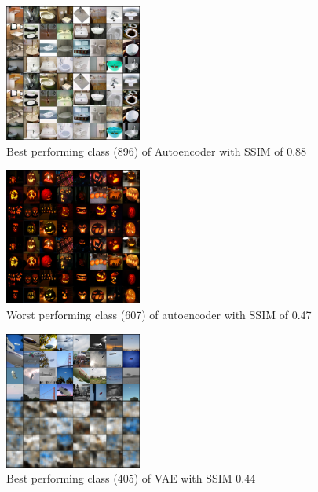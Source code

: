     \begin{figure}
        \centering
        \includegraphics[width=0.4\textwidth]{../../sample_images/evaluation/MAX_AE_IDX_896.png}
        \caption{Best performing class (896) of Autoencoder with SSIM of 0.88}
        \label{fig:imnet_dimensions}
    \end{figure}

    \begin{figure}
        \centering
        \includegraphics[width=0.4\textwidth]{../../sample_images/evaluation/MIN_AE_IDX_607.png}
        \caption{Worst performing class (607) of autoencoder with SSIM of 0.47}
        \label{fig:imnet_dimensions}
    \end{figure}

    \begin{figure}
        \centering
        \includegraphics[width=0.4\textwidth]{../../sample_images/evaluation/MAX_VAE_IDX_405.png}
        \caption{Best performing class (405) of VAE with SSIM 0.44}
        \label{fig:imnet_dimensions}
    \end{figure}
    
